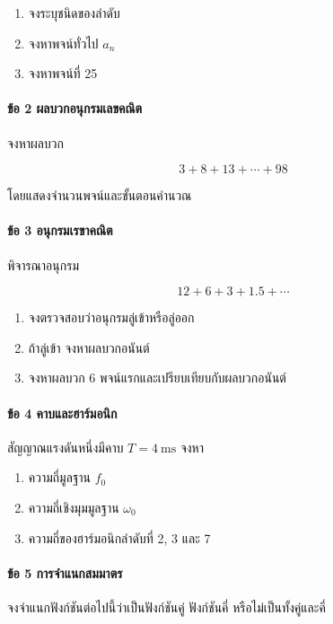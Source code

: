 \begin{enumerate}
\def\labelenumi{\arabic{enumi}.}
\item
  จงระบุชนิดของลำดับ
\item
  จงหาพจน์ทั่วไป \(a_n\)
\item
  จงหาพจน์ที่ 25
\end{enumerate}

\paragraph{ข้อ 2 ผลบวกอนุกรมเลขคณิต}

จงหาผลบวก

\[
3+8+13+\cdots+98
\]

โดยแสดงจำนวนพจน์และขั้นตอนคำนวณ

\paragraph{ข้อ 3 อนุกรมเรขาคณิต}

พิจารณาอนุกรม

\[
12+6+3+1.5+\cdots
\]

\begin{enumerate}
\def\labelenumi{\arabic{enumi}.}
\item
  จงตรวจสอบว่าอนุกรมลู่เข้าหรือลู่ออก
\item
  ถ้าลู่เข้า จงหาผลบวกอนันต์
\item
  จงหาผลบวก 6 พจน์แรกและเปรียบเทียบกับผลบวกอนันต์
\end{enumerate}

\paragraph{ข้อ 4 คาบและฮาร์มอนิก}

สัญญาณแรงดันหนึ่งมีคาบ \(T=4\ \text{ms}\) จงหา

\begin{enumerate}
\def\labelenumi{\arabic{enumi}.}
\item
  ความถี่มูลฐาน \(f_0\)
\item
  ความถี่เชิงมุมมูลฐาน \(\omega_0\)
\item
  ความถี่ของฮาร์มอนิกลำดับที่ 2, 3 และ 7
\end{enumerate}

\paragraph{ข้อ 5 การจำแนกสมมาตร}

จงจำแนกฟังก์ชันต่อไปนี้ว่าเป็นฟังก์ชันคู่ ฟังก์ชันคี่ หรือไม่เป็นทั้งคู่และคี่

